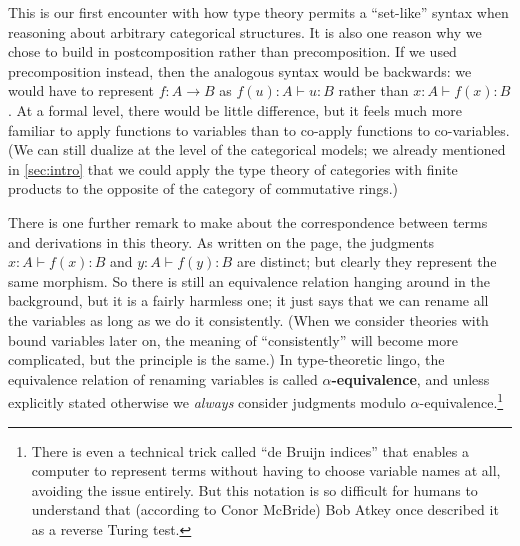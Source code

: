 \documentclass{book}
\let\types\vdash
\begin{document}
This is our first encounter with how type theory permits a ``set-like'' syntax when reasoning about arbitrary categorical structures.
It is also one reason why we chose to build in postcomposition rather than precomposition.
If we used precomposition instead, then the analogous syntax would be backwards: we would have to represent $f:A\to B$ as $f(u):A \types u:B$ rather than $x:A \types f(x):B$.
At a formal level, there would be little difference, but it feels much more familiar to apply functions to variables than to co-apply functions to co-variables.
(We can still dualize at the level of the categorical models; we already mentioned in \cref{sec:intro} that we could apply the type theory of categories with finite products to the opposite of the category of commutative rings.)

There is one further remark to make about the correspondence between terms and derivations in this theory.
As written on the page, the judgments $x:A \types f(x):B$ and $y:A \types f(y):B$ are distinct; but clearly they represent the same morphism.
So there is still an equivalence relation hanging around in the background, but it is a fairly harmless one; it just says that we can rename all the variables as long as we do it consistently.
(When we consider theories with bound variables later on, the meaning of ``consistently'' will become more complicated, but the principle is the same.)
In type-theoretic lingo, the equivalence relation of renaming variables is called \textbf{$\alpha$-equivalence}, and unless explicitly stated otherwise we \emph{always} consider judgments modulo $\alpha$-equivalence.\footnote{There is even a technical trick called ``de Bruijn indices'' that enables a computer to represent terms without having to choose variable names at all, avoiding the issue entirely.  But this notation is so difficult for humans to understand that (according to Conor McBride) Bob Atkey once described it as a reverse Turing test.}
\end{document}
